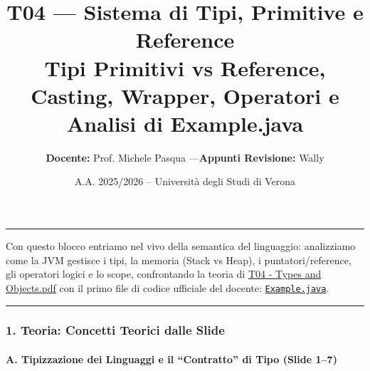 \documentclass[11pt,a4paper]{article}
\title{\Huge\bfseries\sffamily\color{brandblue} T04 --- Sistema di Tipi, Primitive e Reference \\[0.3em] \large\sffamily Tipi Primitivi vs Reference, Casting, Wrapper, Operatori e Analisi di Example.java}
\author{\textbf{Docente:} Prof. Michele Pasqua \quad---\quad \textbf{Appunti Revisione:} Wally}
\date{A.A. 2025/2026 -- Universit\`a degli Studi di Verona}
\newcommand{\passthrough}[1]{#1}
\begin{document}
\maketitle
\thispagestyle{fancy}
\vspace{-1.2em}
\noindent\textcolor{brandblue}{\rule{\textwidth}{0.8pt}}
\vspace{1.2em}

Con questo blocco entriamo nel vivo della semantica del linguaggio:
analizziamo come la JVM gestisce i tipi, la memoria (Stack vs Heap), i
puntatori/reference, gli operatori logici e lo scope, confrontando la
teoria di
\href{file:///home/wally/Documenti/GitHub/Programmazione-II/25-26/Teoria-e-Esercitazioni/Slides-20260902/T04\%20-\%20Types\%20and\%20Objects.pdf}{T04
- Types and Objects.pdf} con il primo file di codice ufficiale del
docente:
\href{file:///home/wally/Documenti/GitHub/Programmazione-II/25-26/Teoria-e-Esercitazioni/Codice-20260902/Lezione04/Example.java}{\passthrough{\lstinline!Example.java!}}.

\begin{center}\rule{0.5\linewidth}{0.5pt}\end{center}

\subsubsection{1. Teoria: Concetti Teorici dalle
Slide}\label{teoria-concetti-teorici-dalle-slide}

\paragraph{A. Tipizzazione dei Linguaggi e il ``Contratto'' di Tipo
(Slide
1--7)}\label{a.-tipizzazione-dei-linguaggi-e-il-contratto-di-tipo-slide-17}
\end{document}
